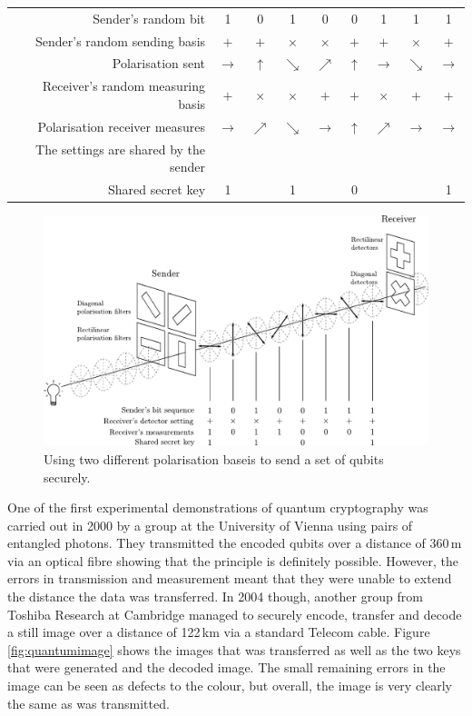 \begin{table}[h!]
	\centering
	\begin{tabular}{r*{8}{c}}
		Sender's random bit & 1 & 0 & 1 & 0 & 0 & 1 & 1 & 1 \\
		Sender's random sending basis & $+$ & $+$ & $\times$ & $\times$ & $+$ & $+$ & $\times$ & $+$ \\
		Polarisation sent & $\rightarrow$ & $\uparrow$ & $\searrow$ & $\nearrow$ & $\uparrow$ & $\rightarrow$ & $\searrow$ & $\rightarrow$ \\
		Receiver's random measuring basis & $+$ & $\times$ & $\times$ & $+$ & $+$ & $\times$ & $+$ & $+$ \\
		Polarisation receiver measures & $\rightarrow$ & $\nearrow$ & $\searrow$ & $\rightarrow$ & $\uparrow$ & $\nearrow$ & $\rightarrow$ & $\rightarrow$ \\ 
		The settings are shared by the sender\\
		Shared secret key & 1 &  & 1 &  & 0 &  &  & 1
	\end{tabular}
\end{table}

\begin{figure}[ht]
	\centering
	\includegraphics[width=1.0\columnwidth]{quantumcrypto.pdf}
	\caption{Using two different polarisation baseis to send a set of qubits securely\cite{quantumcrypto}.\label{fig:quantumcrypto}}
\end{figure}

One of the first experimental demonstrations of quantum cryptography was carried out in 2000 by a group at the University of Vienna using pairs of entangled photons\cite{PhysRevLett.84.4729}. They transmitted the encoded qubits over a distance of 360\,m via an optical fibre showing that the principle is definitely possible. However, the errors in transmission and measurement meant that they were unable to extend the distance the data was transferred. In 2004 though, another group from Toshiba Research at Cambridge managed to securely encode, transfer and decode a still image over a distance of 122\,km via a standard Telecom cable\cite{gobby:3762}. Figure \ref{fig:quantumimage} shows the images that was transferred as well as the two keys that were generated and the decoded image. The small remaining errors in the image can be seen as defects to the colour, but overall, the image is very clearly the same as was transmitted.

